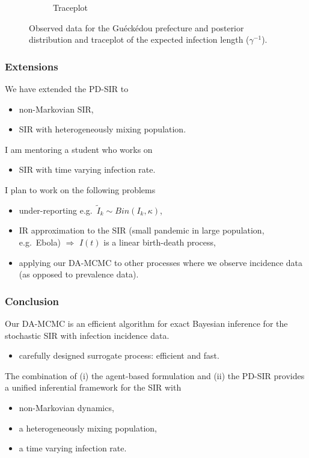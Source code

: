 \documentclass{beamer}
\begin{document}
\begin{frame}
\begin{figure}
\begin{subfigure}[b]{0.32\textwidth}
			\caption{Traceplot}
		\end{subfigure}
		\caption{Observed data for the Gu\'eck\'edou prefecture and posterior distribution and traceplot of the expected infection length ($\gamma^{-1}$).}
		\label{fig:ebola}
	\end{figure}
	
	
\end{frame}


\begin{frame} \frametitle{Extensions}  
	
	We have extended the PD-SIR to
	\begin{itemize}
		\item non-Markovian SIR,
		\item SIR with heterogeneously mixing population.
	\end{itemize}

	I am mentoring a student who works on 
	\begin{itemize}
		\item SIR with time varying infection rate.
	\end{itemize}

	I plan to work on the following problems
	\begin{itemize}
		\item under-reporting e.g.\ $\tilde{I}_k \sim Bin(I_k, \kappa)$,
		\item IR approximation to the SIR (small pandemic in large population, e.g.\ Ebola) $\Rightarrow$ $I(t)$ is a linear birth-death process,
		\item applying our DA-MCMC to other processes where we observe incidence data (as opposed to prevalence data).
	\end{itemize}
	
\end{frame}



\begin{frame} \frametitle{Conclusion}  
	
	
	Our DA-MCMC is an efficient algorithm for exact Bayesian inference for the stochastic SIR with infection incidence data.	
	\begin{itemize}
		\item carefully designed surrogate process: efficient and fast.
	\end{itemize}
	
	The combination of (i) the agent-based formulation and (ii) the PD-SIR provides a unified inferential framework for the SIR with
	\begin{itemize}
		\item non-Markovian dynamics,
		\item a heterogeneously mixing population,
		\item a time varying infection rate.
	\end{itemize}
	
\end{frame}
\end{document}
